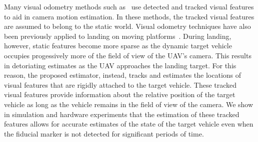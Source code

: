 Many visual odometry methods such
as~\cite{qin2018vins,leutenegger2013keyframe,mourikis2007multi,mur2015orb} use
detected and tracked visual features to aid in camera motion estimation.
In these methods, the tracked visual features are assumed to belong to the
static world.
Visual odometry techniques
have also been previously applied to landing on
moving platforms~\cite{falanga2017vision}.
During landing, however, static features become more sparse as the dynamic target vehicle
occupies progessively more of the
field of view of the UAV's camera. This results in detoriating
estimates as the UAV approaches the landing target.
For this reason, the proposed estimator, instead, tracks and estimates the
locations of
visual features that are rigidly attached to the target vehicle. These tracked
visual features provide information about the relative position of the target
vehicle
as long as the vehicle remains in the field of view of the camera.
We show in simulation and hardware experiments that the estimation of these tracked features allows
for accurate estimates of the state of the target vehicle even
when the fiducial marker is not detected for significant periods of time.

